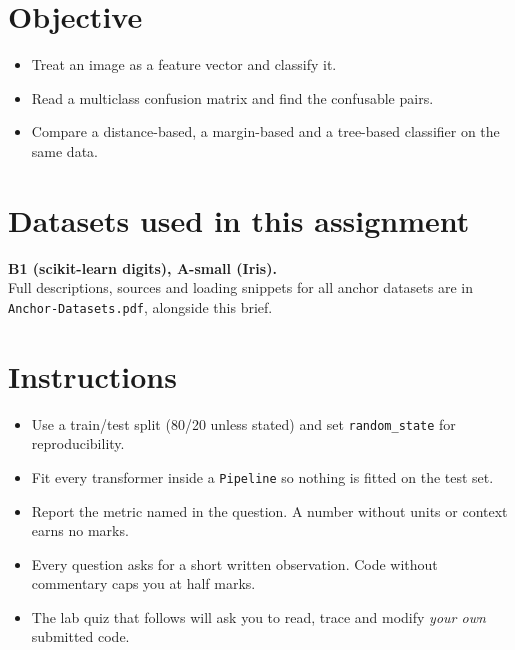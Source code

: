 \documentclass[11pt,a4paper]{article}
\begin{document}

\section*{Objective}

\begin{itemize}[leftmargin=*]

  \item Treat an image as a feature vector and classify it.

  \item Read a multiclass confusion matrix and find the confusable pairs.

  \item Compare a distance-based, a margin-based and a tree-based classifier on the same data.

\end{itemize}

\section*{Datasets used in this assignment}

\textbf{B1 (scikit-learn digits), A-small (Iris).}\\ Full descriptions, sources and loading snippets for all anchor datasets are in \texttt{Anchor-Datasets.pdf}, alongside this brief.

\section*{Instructions}

\begin{itemize}[leftmargin=*]

  \item Use a train/test split (80/20 unless stated) and set \texttt{random\_state} for reproducibility.

  \item Fit every transformer inside a \texttt{Pipeline} so nothing is fitted on the test set.

  \item Report the metric named in the question. A number without units or context earns no marks.

  \item Every question asks for a short written observation. Code without commentary caps you at half marks.

  \item The lab quiz that follows will ask you to read, trace and modify \emph{your own} submitted code.

\end{itemize}
\end{document}
